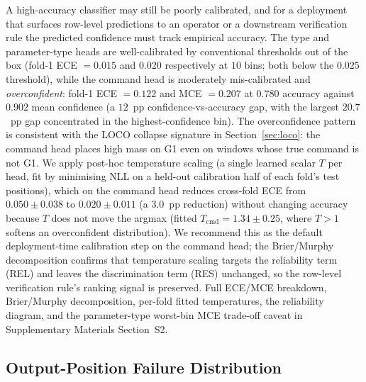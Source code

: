 \documentclass[sensors,article,submit,moreauthors,pdftex]{Definitions/mdpi}
\begin{document}
A high-accuracy classifier may still be poorly calibrated, and for a deployment that surfaces row-level predictions to an operator or a downstream verification rule the predicted confidence must track empirical accuracy. The type and parameter-type heads are well-calibrated by conventional thresholds out of the box (fold-1 ECE $= 0.015$ and $0.020$ respectively at $10$ bins; both below the $0.025$ threshold), while the command head is moderately mis-calibrated and \emph{overconfident}: fold-1 ECE $= 0.122$ and MCE $= 0.207$ at $0.780$ accuracy against $0.902$ mean confidence (a $12$~pp confidence-vs-accuracy gap, with the largest $20.7$~pp gap concentrated in the highest-confidence bin). The overconfidence pattern is consistent with the LOCO collapse signature in Section~\ref{sec:loco}: the command head places high mass on G1 even on windows whose true command is not G1. We apply post-hoc temperature scaling (a single learned scalar $T$ per head, fit by minimising NLL on a held-out calibration half of each fold's test positions), which on the command head reduces cross-fold ECE from $0.050 \pm 0.038$ to $0.020 \pm 0.011$ (a $3.0$~pp reduction) without changing accuracy because $T$ does not move the argmax (fitted $T_{\text{cmd}} = 1.34 \pm 0.25$, where $T > 1$ softens an overconfident distribution). We recommend this as the default deployment-time calibration step on the command head; the Brier/Murphy decomposition confirms that temperature scaling targets the reliability term (REL) and leaves the discrimination term (RES) unchanged, so the row-level verification rule's ranking signal is preserved. Full ECE/MCE breakdown, Brier/Murphy decomposition, per-fold fitted temperatures, the reliability diagram, and the parameter-type worst-bin MCE trade-off caveat in Supplementary Materials Section~S2.

\subsection{Output-Position Failure Distribution}
\label{sec:output-position-failure}
\end{document}

